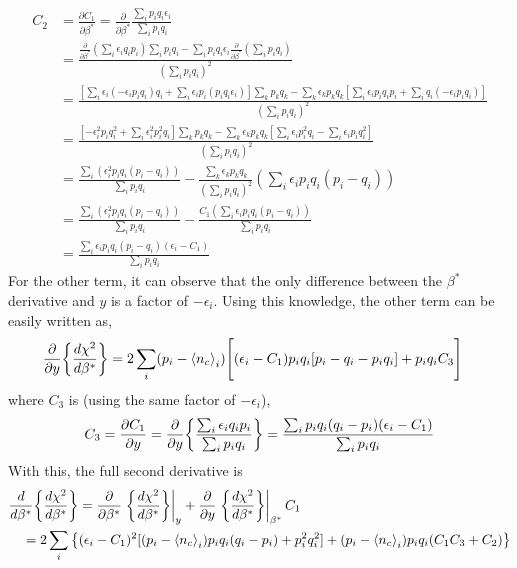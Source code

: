 \begin{align}
    C_2&=\frac{\partial C_1}{\partial \beta^*}=\frac{\partial}{\partial \beta^*} \frac{\sum_i p_i q_i \epsilon_i}{\sum_i p_i q_i}\nonumber\\
    &=\frac{\frac{\partial }{\partial \beta^*}(\sum_i \epsilon_i q_i p_i) \sum_i p_i q_i - \sum_i p_i q_i \epsilon_i \frac{\partial}{\partial \beta^*}(\sum_i p_i q_i)}{(\sum_i p_i q_i)^2}\nonumber\\
    &=\frac{[\sum_i \epsilon_i(-\epsilon_i p_i q_i)q_i + \sum_i \epsilon_i p_i (p_i q_i \epsilon_i)]\sum_k p_k q_k-\sum_k \epsilon_k p_k q_k[\sum_i \epsilon_i p_i q_i p_i+\sum_i q_i(-\epsilon_i p_i q_i)]}{(\sum_i p_i q_i)^2}\nonumber\\
    &=\frac{[-\epsilon_i^2p_i q_i^2+ \sum_i \epsilon_i^2 p_i^2 q_i]\sum_k p_k q_k-\sum_k \epsilon_k p_k q_k[\sum_i \epsilon_i p_i^2 q_i-\sum_i \epsilon_i p_i q_i^2]}{(\sum_i p_i q_i)^2}\nonumber\\
    &=\frac{\sum_i(\epsilon_i^2 p_i q_i(p_i-q_i))}{\sum_i p_i q_i}-\frac{\sum_k \epsilon_k p_k q_k}{(\sum_i p_i q_i)^2}(\sum_i \epsilon_i p_i q_i (p_i-q_i))\nonumber\\
    &=\frac{\sum_i(\epsilon_i^2 p_i q_i(p_i-q_i))}{\sum_i p_i q_i}-\frac{C_1(\sum_i \epsilon_i p_i q_i (p_i-q_i))}{\sum_i p_i q_i}\nonumber\\
    &=\frac{\sum_i \epsilon_i p_i q_i(p_i - q_i)(\epsilon_i-C_1)}{\sum_i p_i q_i}
\end{align}
For the other term, it can observe that the only difference between the $\beta^*$ derivative and $y$ is a factor of $-\epsilon_i$. Using this knowledge, the other term can be easily written as,
\begin{align}
    \frac{\partial}{\partial y}\qty{\frac{d\chi^2}{d\beta^*}}&=2 
    \sum_i (p_i-\left<{n_c}\right>_i)\Biggr[(\epsilon_i-C_1)p_iq_i[p_i-q_i-p_iq_i]+p_iq_iC_3\Biggr]
\end{align}
where $C_3$ is (using the same factor of $-\epsilon_i$),
\begin{gather}
    C_3=\frac{\partial C_1}{\partial y}=\frac{\partial}{\partial 
    y}\qty{\frac{\sum_i \epsilon_i q_i p_i}{\sum_i p_i q_i}}=\frac{\sum_i p_i q_i(q_i-p_i)(\epsilon_i-C_1)}{\sum_i p_i q_i}
\end{gather}
With this, the full second derivative is
\begin{align}
&\frac{d}{d\beta^*} \qty{\frac{d \chi^2}{d\beta^*}} = \frac{\partial }{\partial \beta^*} \eval{\qty{\frac{d \chi^2}{d\beta^*}}}_y+ \frac{\partial }{\partial y} \eval{\qty{\frac{d \chi^2}{d\beta^*}}}_{\beta^*} C_1\nonumber\\
&\quad=2\sum_i\qty{(\epsilon_i-C_1)^2[(p_i-\avg{n_c}_i)p_iq_i(q_i-p_i)+p_i^2q_i^2]+(p_i-\avg{n_c}_i)p_iq_i(C_1C_3+C_2)}
\end{align}